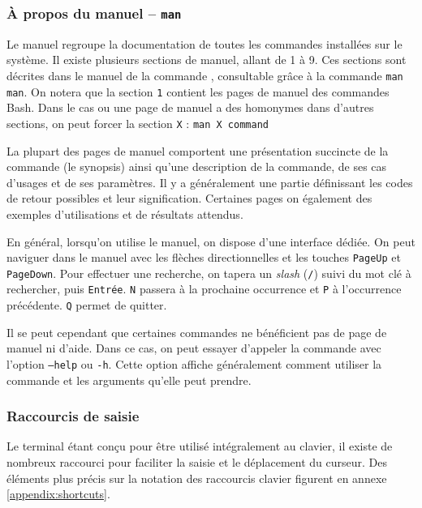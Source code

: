 \subsubsection{À propos du manuel -- \texttt{man}} 

Le manuel regroupe la documentation de toutes les commandes installées sur le système. Il existe plusieurs sections de manuel, allant de 1 à 9. Ces sections sont décrites dans le manuel de la commande , consultable grâce à la commande \texttt{man man}. On notera que la section \texttt{1} contient les pages de manuel des commandes Bash. Dans le cas ou une page de manuel a des homonymes dans d'autres sections, on peut forcer la section \texttt{X} : \texttt{man X command}

La plupart des pages de manuel comportent une présentation succincte de la commande (le synopsis) ainsi qu'une description de la commande, de ses cas d'usages et de ses paramètres. Il y a généralement une partie définissant les codes de retour possibles et leur signification. Certaines pages on également des exemples d'utilisations et de résultats attendus.

En général, lorsqu'on utilise le manuel, on dispose d'une interface dédiée. On peut naviguer dans le manuel avec les flèches directionnelles et les touches \texttt{PageUp} et \texttt{PageDown}. Pour effectuer une recherche, on tapera un \textit{slash} (\texttt{/}) suivi du mot clé à rechercher, puis \texttt{Entrée}. \texttt{N} passera à la prochaine occurrence et \texttt{P} à l'occurrence précédente. \texttt{Q} permet de quitter.

Il se peut cependant que certaines commandes ne bénéficient pas de page de manuel ni d'aide. Dans ce cas, on peut essayer d'appeler la commande avec l'option \texttt{--help} ou \texttt{-h}. Cette option affiche généralement comment utiliser la commande et les arguments qu'elle peut prendre.

\newpage

\vspace{-4mm}
\subsubsection{Raccourcis de saisie}
\vspace{-2mm}

Le terminal étant conçu pour être utilisé intégralement au clavier, il existe de nombreux raccourci pour faciliter la saisie et le déplacement du curseur. Des éléments plus précis sur la notation des raccourcis clavier figurent en annexe \ref{appendix:shortcuts}.

